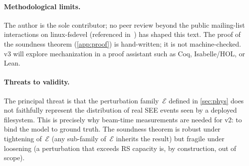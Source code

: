 \paragraph{Methodological limits.}
The author is the sole contributor; no peer review beyond the
public mailing-list interactions on linux-fsdevel
(referenced in~\cite{ftrfs-rfc-thread}) has shaped this text.
The proof of the soundness theorem (\cref{app:proof}) is
hand-written; it is not machine-checked. v3 will explore
mechanization in a proof assistant such as Coq, Isabelle/HOL,
or Lean.

\paragraph{Threats to validity.}
The principal threat is that the perturbation family~\(\mathcal{E}\)
defined in \cref{sec:phys} does not faithfully represent the
distribution of real SEE events seen by a deployed filesystem.
This is precisely why beam-time measurements are needed for v2:
to bind the model to ground truth. The soundness theorem is
robust under tightening of~\(\mathcal{E}\) (any sub-family
of~\(\mathcal{E}\) inherits the result) but fragile under
loosening (a perturbation that exceeds RS capacity is, by
construction, out of scope).
